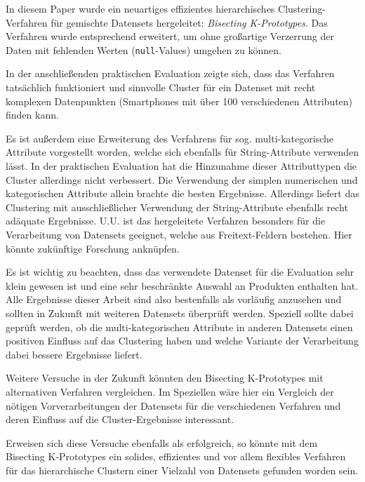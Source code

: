 In diesem Paper wurde ein neuartiges effizientes hierarchisches
Clustering-Verfahren für gemischte Datensets hergeleitet:
\emph{Bisecting K-Prototypes}. Das Verfahren wurde entsprechend
erweitert, um ohne großartige Verzerrung der Daten mit fehlenden Werten
(\texttt{null}-Values) umgehen zu können.

In der anschließenden praktischen Evaluation zeigte sich, dass das
Verfahren tatsächlich funktioniert und sinnvolle Cluster für ein
Datenset mit recht komplexen Datenpunkten (Smartphones mit über 100
verschiedenen Attributen) finden kann.

Es ist außerdem eine Erweiterung des Verfahrens für sog.
multi-kategorische Attribute vorgestellt worden, welche sich ebenfalls
für String-Attribute verwenden lässt. In der praktischen Evaluation hat
die Hinzunahme dieser Attributtypen die Cluster allerdings nicht
verbessert. Die Verwendung der simplen numerischen und kategorischen
Attribute allein brachte die besten Ergebnisse. Allerdings liefert das
Clustering mit ausschließlicher Verwendung der String-Attribute
ebenfalls recht adäquate Ergebnisse. U.U. ist das hergeleitete Verfahren
besonders für die Verarbeitung von Datensets geeignet, welche aus
Freitext-Feldern bestehen. Hier könnte zukünftige Forschung anknüpfen.

Es ist wichtig zu beachten, dass das verwendete Datenset für die
Evaluation sehr klein gewesen ist und eine sehr beschränkte Auswahl an
Produkten enthalten hat. Alle Ergebnisse dieser Arbeit sind also
bestenfalls als vorläufig anzusehen und sollten in Zukunft mit weiteren
Datensets überprüft werden. Speziell sollte dabei geprüft werden, ob die
multi-kategorischen Attribute in anderen Datensets einen positiven
Einfluss auf das Clustering haben und welche Variante der Verarbeitung
dabei bessere Ergebnisse liefert.

Weitere Versuche in der Zukunft könnten den Bisecting K-Prototypes mit
alternativen Verfahren vergleichen. Im Speziellen wäre hier ein
Vergleich der nötigen Vorverarbeitungen der Datensets für die
verschiedenen Verfahren und deren Einfluss auf die Cluster-Ergebnisse
interessant.

Erweisen sich diese Versuche ebenfalls als erfolgreich, so könnte mit
dem Bisecting K-Prototypes ein solides, effizientes und vor allem
flexibles Verfahren für das hierarchische Clustern einer Vielzahl von
Datensets gefunden worden sein.

